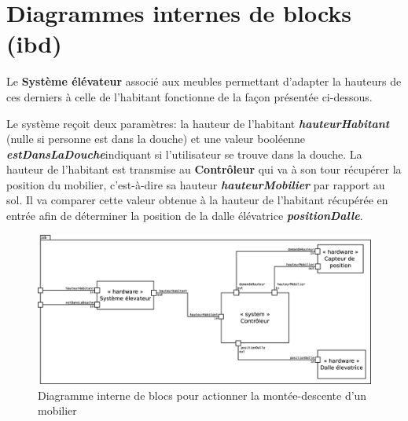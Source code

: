 \chapter{Diagrammes internes de blocks (ibd)}
Le \textbf{Système élévateur} associé aux meubles permettant d'adapter la hauteurs de ces derniers à celle de l'habitant fonctionne de la façon présentée ci-dessous.

Le système reçoit deux paramètres: la hauteur de l'habitant \textbf{\textit{hauteurHabitant}} (nulle si personne est dans la douche) et une valeur booléenne \textbf{\textit{estDansLaDouche}}indiquant si l'utilisateur se trouve dans la douche. 
La hauteur de l'habitant est transmise au \textbf{Contrôleur} qui va à son tour récupérer la position du mobilier, c'est-à-dire sa hauteur \textbf{\textit{hauteurMobilier}} par rapport au sol. Il va comparer cette valeur obtenue à la hauteur de l'habitant récupérée en entrée afin de déterminer la position de la dalle élévatrice \textbf{\textit{positionDalle}}. 
\begin{figure}[H]
	\centering
	\includegraphics[width=1\linewidth]{diagrams/bathroom/diagramme_blocks_ibd.eps}
	\caption{Diagramme interne de blocs pour actionner la montée-descente d'un mobilier}
	\label{fig:diagramme_ibd}
\end{figure}
